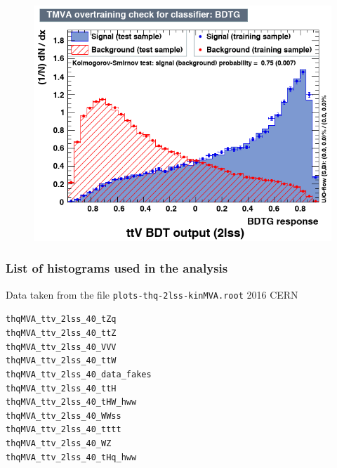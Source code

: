 \documentclass[11pt]{beamer}
\begin{document}
\begin{frame}
\begin{center}
	\begin{figure}
		\includegraphics[scale=0.5]{figures/sk.png}
	\end{figure}
\end{center}
\end{frame}

\begin{frame}
\frametitle{List of histograms used in the analysis}
Data taken from the file \texttt{plots-thq-2lss-kinMVA.root} 2016 CERN 
\begin{alltt}
thqMVA\_ttv\_2lss\_40\_tZq \\
thqMVA\_ttv\_2lss\_40\_ttZ\\
thqMVA\_ttv\_2lss\_40\_VVV\\
thqMVA\_ttv\_2lss\_40\_ttW\\
thqMVA\_ttv\_2lss\_40\_data\_fakes\\
thqMVA\_ttv\_2lss\_40\_ttH\\
thqMVA\_ttv\_2lss\_40\_tHW\_hww\\
thqMVA\_ttv\_2lss\_40\_WWss\\
thqMVA\_ttv\_2lss\_40\_tttt\\
thqMVA\_ttv\_2lss\_40\_WZ\\
thqMVA\_ttv\_2lss\_40\_tHq\_hww\\
\end{alltt}
\end{frame}
\end{document}
